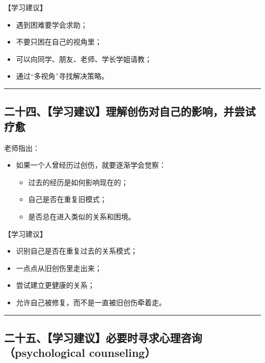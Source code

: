 \documentclass[
  chinese,
  9pt,
  a4paper,
]{ctexart}
\providecommand{\tightlist}{%
  \setlength{\itemsep}{0pt}\setlength{\parskip}{0pt}}
\begin{document}
【学习建议】

\begin{itemize}
\tightlist
\item
  遇到困难要学会求助；
\item
  不要只困在自己的视角里；
\item
  可以向同学、朋友、老师、学长学姐请教；
\item
  通过``多视角''寻找解决策略。
\end{itemize}

\begin{center}\rule{0.5\linewidth}{0.5pt}\end{center}

\subsection{二十四、【学习建议】理解创伤对自己的影响，并尝试疗愈}\label{ux4e8cux5341ux56dbux5b66ux4e60ux5efaux8baeux7406ux89e3ux521bux4f24ux5bf9ux81eaux5df1ux7684ux5f71ux54cdux5e76ux5c1dux8bd5ux7597ux6108}

老师指出：

\begin{itemize}
\item
  如果一个人曾经历过创伤，就要逐渐学会觉察：

  \begin{itemize}
  \tightlist
  \item
    过去的经历是如何影响现在的；
  \item
    自己是否在重复旧模式；
  \item
    是否总在进入类似的关系和困境。
  \end{itemize}
\end{itemize}

【学习建议】

\begin{itemize}
\tightlist
\item
  识别自己是否在重复过去的关系模式；
\item
  一点点从旧创伤里走出来；
\item
  尝试建立更健康的关系；
\item
  允许自己被修复，而不是一直被旧创伤牵着走。
\end{itemize}

\begin{center}\rule{0.5\linewidth}{0.5pt}\end{center}

\subsection{二十五、【学习建议】必要时寻求心理咨询（psychological
counseling）}\label{ux4e8cux5341ux4e94ux5b66ux4e60ux5efaux8baeux5fc5ux8981ux65f6ux5bfbux6c42ux5fc3ux7406ux54a8ux8be2psychological-counseling}
\end{document}
